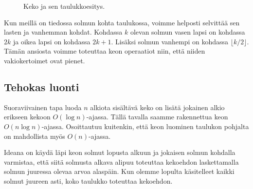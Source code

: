 \begin{figure}
\center
{}
\caption{Keko ja sen taulukkoesitys.}
\label{fig:kektau}
\end{figure}

Kun meillä on tiedossa solmun kohta taulukossa,
voimme helposti selvittää sen lasten ja vanhemman kohdat.
Kohdassa $k$ olevan solmun vasen lapsi on kohdassa $2k$
ja oikea lapsi on kohdassa $2k+1$.
Lisäksi solmun vanhempi on kohdassa $\lfloor k/2 \rfloor$.
Tämän ansiosta voimme toteuttaa keon operaatiot niin,
että niiden vakiokertoimet ovat pienet.

\subsection{Tehokas luonti}

Suoraviivainen tapa luoda $n$ alkiota sisältävä keko
on lisätä jokainen alkio erikseen kekoon $O(\log n)$-ajassa.
Tällä tavalla saamme rakennettua keon $O(n \log n)$-ajassa.
Osoittautuu kuitenkin, että keon luominen taulukon pohjalta
on mahdollista myös $O(n)$-ajassa.

Ideana on käydä läpi keon solmut lopusta alkuun ja
jokaisen solmun kohdalla varmistaa,
että siitä solmusta alkava alipuu toteuttaa kekoehdon
laskettamalla solmun juuressa olevaa arvoa alaspäin.
Kun olemme lopulta käsitelleet kaikki solmut juureen asti,
koko taulukko toteuttaa kekoehdon.

